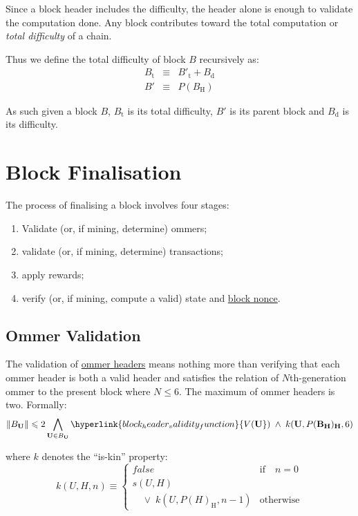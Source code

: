 \documentclass[9pt,oneside]{amsart}
\begin{document}
\begin{multicols}{2}
Since a block header includes the difficulty, the header alone is enough to validate the computation done. Any block contributes toward the total computation or \textit{total difficulty} of a chain.

Thus we define the total difficulty of block $B$ recursively as:
\begin{eqnarray}
B_{\mathrm{t}} & \equiv & B'_{\mathrm{t}} + B_{\mathrm{d}} \\
B' & \equiv & P(B_{\mathrm{H}})
\end{eqnarray}

As such given a block $B$, $B_{\mathrm{t}}$ is its total difficulty, $B'$ is its parent block and $B_{\mathrm{d}}$ is its difficulty.

\section{Block Finalisation} \label{ch:finalisation}

The process of finalising a block involves four stages:

\begin{enumerate}
\item Validate (or, if mining, determine) ommers;
\item validate (or, if mining, determine) transactions;
\item apply rewards;
\item verify (or, if mining, compute a valid) state and \hyperlink{block_nonce}{block nonce}.
\end{enumerate}

\subsection{Ommer Validation}

The validation of \hyperlink{ommer_block_headers_B__U}{ommer headers} means nothing more than verifying that each ommer header is both a valid header and satisfies the relation of $N$th-generation ommer to the present block where $N \leq 6$. The maximum of ommer headers is two. Formally:
\begin{equation}
\lVert B_{\mathbf{U}} \rVert \leqslant 2 \bigwedge_{\mathbf{U} \in B_{\mathbf{U}}} \hyperlink{block_header_validity_function}{V({\mathbf{U}}})\; \wedge \; k({\mathbf{U}}, P(\mathbf{B}_{\mathbf{H}})_{\mathbf{H}}, 6)
\end{equation}

where $k$ denotes the ``is-kin'' property:
\begin{equation}
k(U, H, n) \equiv \begin{cases} \mathit{false} & \text{if} \quad n = 0 \\
s(U, H) &\\
\quad \vee \; k(U, P(H)_{\mathrm{H}}, n - 1) & \text{otherwise}
\end{cases}
\end{equation}


\end{multicols}
\end{document}
